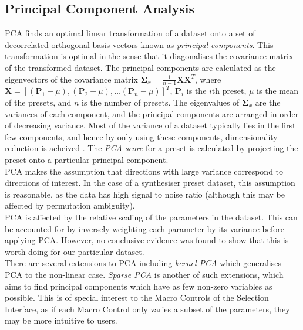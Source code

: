 \documentclass[11pt, oneside]{report}   	%
\renewcommand{\vec}[1]{\mathbf{#1}}
\begin{document}
\subsection{Principal Component Analysis}\label{sec:PCA}
PCA finds an optimal linear transformation of a dataset onto a set of decorrelated orthogonal basis vectors known as \emph{principal components}. This transformation is optimal in the sense that it diagonalises the covariance matrix of the transformed dataset. 
The principal components are calculated as the eigenvectors of the covariance matrix $\vec{\Sigma}_x = \frac{1}{n-1}\vec{X}\vec{X}^T$, where $\vec{X} = [(\vec{P}_1-\mu), (\vec{P}_2-\mu), \dots (\vec{P}_n-\mu)]^T$, $\vec{P}_i$ is the $i$th preset, $\mu$ is the mean of the presets, and $n$ is the number of presets.
The eigenvalues of $\vec{\Sigma}_x$ are the variances of each component, and the principal components are arranged in order of decreasing variance.
Most of the variance of a dataset typically lies in the first few components, and hence by only using these components, dimensionality reduction is acheived \cite{PCA}. The \emph{PCA score} for a preset is calculated by projecting the preset onto a particular principal component.\\
PCA makes the assumption that directions with large variance correspond to directions of interest. In the case of a synthesiser preset dataset, this assumption is reasonable, as the data has high signal to noise ratio (although this may be affected by permutation ambiguity).\\
PCA is affected by the relative scaling of the parameters in the dataset. This can be accounted for by inversely weighting each parameter by its variance before applying PCA. However, no conclusive evidence was found to show that this is worth doing for our particular dataset.\\
There are several extensions to PCA including \emph{kernel PCA} which generalises PCA to the non-linear case. \emph{Sparse PCA} is another of such extensions, which aims to find principal components which have as few non-zero variables as possible. This is of special interest to the Macro Controls of the Selection Interface, as if each Macro Control only varies a subset of the parameters, they may be more intuitive to users.
\end{document}
